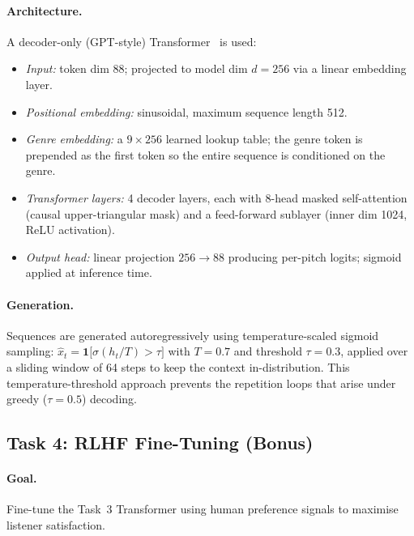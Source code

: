 \documentclass[letterpaper]{article}
\begin{document}
\paragraph{Architecture.}
A decoder-only (GPT-style) Transformer~\cite{vaswani2017attention} is used:
\begin{itemize}
  \item \emph{Input:} token dim 88; projected to model dim $d = 256$
        via a linear embedding layer.
  \item \emph{Positional embedding:} sinusoidal, maximum sequence length 512.
  \item \emph{Genre embedding:} a $9 \times 256$ learned lookup table;
        the genre token is prepended as the first token so the entire
        sequence is conditioned on the genre.
  \item \emph{Transformer layers:} 4 decoder layers, each with 8-head
        masked self-attention (causal upper-triangular mask) and a
        feed-forward sublayer (inner dim 1024, ReLU activation).
  \item \emph{Output head:} linear projection $256 \to 88$ producing
        per-pitch logits; sigmoid applied at inference time.
\end{itemize}

\paragraph{Generation.}
Sequences are generated autoregressively using temperature-scaled sigmoid
sampling: $\hat{x}_t = \mathbf{1}\!\bigl[\sigma(h_t / T) > \tau\bigr]$
with $T = 0.7$ and threshold $\tau = 0.3$, applied over a sliding window
of 64 steps to keep the context in-distribution.
This temperature-threshold approach prevents the repetition loops
that arise under greedy ($\tau = 0.5$) decoding.

\subsection{Task 4: RLHF Fine-Tuning (Bonus)}
\label{sec:task4}

\paragraph{Goal.}
Fine-tune the Task~3 Transformer using human preference signals to
maximise listener satisfaction.
\end{document}

